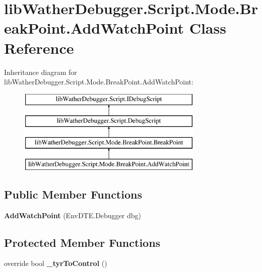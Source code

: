 \hypertarget{classlib_wather_debugger_1_1_script_1_1_mode_1_1_break_point_1_1_add_watch_point}{\section{lib\+Wather\+Debugger.\+Script.\+Mode.\+Break\+Point.\+Add\+Watch\+Point Class Reference}
\label{classlib_wather_debugger_1_1_script_1_1_mode_1_1_break_point_1_1_add_watch_point}
}
Inheritance diagram for lib\+Wather\+Debugger.\+Script.\+Mode.\+Break\+Point.\+Add\+Watch\+Point\+:\begin{figure}[H]
\begin{center}
\leavevmode
\includegraphics[height=4.000000cm]{classlib_wather_debugger_1_1_script_1_1_mode_1_1_break_point_1_1_add_watch_point}
\end{center}
\end{figure}
\subsection*{Public Member Functions}
\begin{DoxyCompactItemize}
\item 
\hypertarget{classlib_wather_debugger_1_1_script_1_1_mode_1_1_break_point_1_1_add_watch_point_ac9a282a3cb0277b623b16409646f7ab2}{{\bfseries Add\+Watch\+Point} (Env\+D\+T\+E.\+Debugger dbg)}\label{classlib_wather_debugger_1_1_script_1_1_mode_1_1_break_point_1_1_add_watch_point_ac9a282a3cb0277b623b16409646f7ab2}

\end{DoxyCompactItemize}
\subsection*{Protected Member Functions}
\begin{DoxyCompactItemize}
\item 
\hypertarget{classlib_wather_debugger_1_1_script_1_1_mode_1_1_break_point_1_1_add_watch_point_a6562cb34cdb6b7a88d5b64a3f94b2ac2}{override bool {\bfseries \+\_\+tyr\+To\+Control} ()}\label{classlib_wather_debugger_1_1_script_1_1_mode_1_1_break_point_1_1_add_watch_point_a6562cb34cdb6b7a88d5b64a3f94b2ac2}

\end{DoxyCompactItemize}
